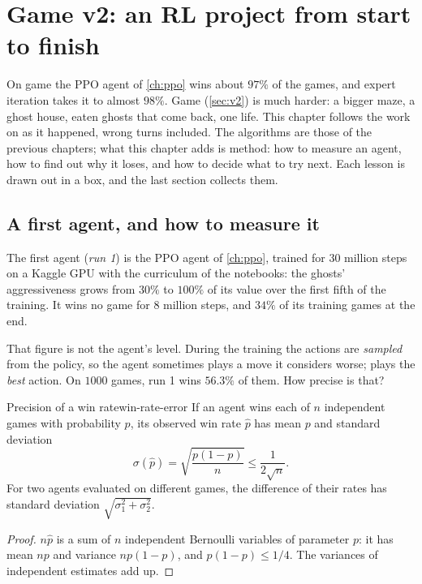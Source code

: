 \chapter{Game v2: an RL project from start to finish}
\label{ch:v2-project}

On game  the PPO agent of \cref{ch:ppo} wins about $97\%$ of the
games, and expert iteration takes it to almost $98\%$. Game 
(\cref{sec:v2}) is much harder: a bigger maze, a ghost house, eaten ghosts
that come back, one life. This chapter follows the work on  as it
happened, wrong turns included. The algorithms are those of the previous
chapters; what this chapter adds is method: how to measure an agent, how to
find out why it loses, and how to decide what to try next. Each lesson is
drawn out in a box, and the last section collects them.

\section{A first agent, and how to measure it}

The first agent (\emph{run 1}) is the PPO agent of \cref{ch:ppo}, trained
for $30$ million steps on a Kaggle GPU with the curriculum of the
notebooks: the ghosts' aggressiveness grows from $30\%$ to $100\%$ of its
value over the first fifth of the training. It wins no game for $8$ million
steps, and $34\%$ of its training games at the end.

That figure is not the agent's level. During the training the actions are
\emph{sampled} from the policy, so the agent sometimes plays a move it
considers worse;  plays the \emph{best} action. On
$1000$ games, run 1 wins $56.3\%$ of them. How precise is that?

\begin{proposition}{Precision of a win rate}{win-rate-error}
  If an agent wins each of $n$ independent games with probability $p$, its
  observed win rate $\hat p$ has mean $p$ and standard deviation
  \begin{equation}
    \sigma(\hat p) = \sqrt{\frac{p(1 - p)}{n}} \le \frac{1}{2\sqrt n}.
  \end{equation}
  For two agents evaluated on different games, the difference of their
  rates has standard deviation $\sqrt{\sigma_1^2 + \sigma_2^2}$.
\end{proposition}

\begin{proof}
  $n \hat p$ is a sum of $n$ independent Bernoulli variables of parameter
  $p$: it has mean $np$ and variance $np(1 - p)$, and $p(1 - p) \le 1/4$.
  The variances of independent estimates add up.
\end{proof}

